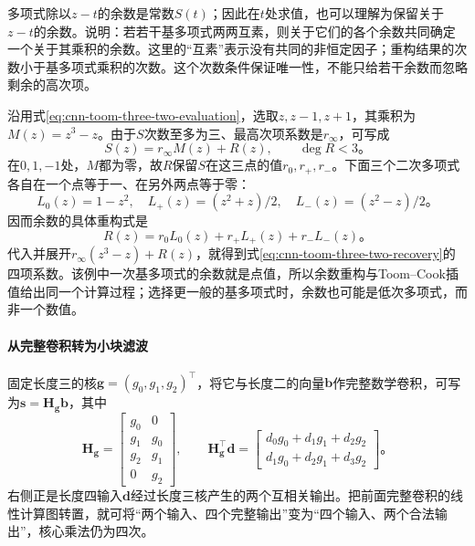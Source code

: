 多项式除以$z-t$的余数是常数$S(t)$；因此在$t$处求值，也可以理解为保留关于$z-t$的余数。说明：若若干基多项式两两互素，则关于它们的各个余数共同确定一个关于其乘积的余数。这里的“互素”表示没有共同的非恒定因子；重构结果的次数小于基多项式乘积的次数。这个次数条件保证唯一性，不能只给若干余数而忽略剩余的高次项。

沿用式\eqref{eq:cnn-toom-three-two-evaluation}，选取$z,z-1,z+1$，其乘积为$M(z)=z^3-z$。由于$S$次数至多为三、最高次项系数是$r_\infty$，可写成
\begin{equation}
  S(z)=r_\infty M(z)+R(z),\qquad \deg R<3\text{。}
  \label{eq:cnn-winograd-polynomial-remainder}
\end{equation}
在$0,1,-1$处，$M$都为零，故$R$保留$S$在这三点的值$r_0,r_+,r_-$。下面三个二次多项式各自在一个点等于一、在另外两点等于零：
\[
  L_0(z)=1-z^2,\quad
  L_+(z)=(z^2+z)/2,\quad
  L_-(z)=(z^2-z)/2\text{。}
\]
因而余数的具体重构式是
\begin{equation}
  R(z)=r_0L_0(z)+r_+L_+(z)+r_-L_-(z)\text{。}
  \label{eq:cnn-winograd-remainder-reconstruction}
\end{equation}
代入并展开$r_\infty(z^3-z)+R(z)$，就得到式\eqref{eq:cnn-toom-three-two-recovery}的四项系数。该例中一次基多项式的余数就是点值，所以余数重构与Toom--Cook插值给出同一个计算过程；选择更一般的基多项式时，余数也可能是低次多项式，而非一个数值。

\paragraph{从完整卷积转为小块滤波}

固定长度三的核$\bm g=(g_0,g_1,g_2)^\top$，将它与长度二的向量$\bm b$作完整数学卷积，可写为$\bm s=\bm H_{\bm g}\bm b$，其中
\begin{equation}
  \bm H_{\bm g}=\begin{bmatrix}
    g_0&0\\g_1&g_0\\g_2&g_1\\0&g_2
  \end{bmatrix},\qquad
  \bm H_{\bm g}^\top\bm d=
  \begin{bmatrix}
    d_0g_0+d_1g_1+d_2g_2\\
    d_1g_0+d_2g_1+d_3g_2
  \end{bmatrix}\text{。}
  \label{eq:cnn-winograd-filter-transposition}
\end{equation}
右侧正是长度四输入$\bm d$经过长度三核产生的两个互相关输出。把前面完整卷积的线性计算图转置，就可将“两个输入、四个完整输出”变为“四个输入、两个合法输出”，核心乘法仍为四次。

